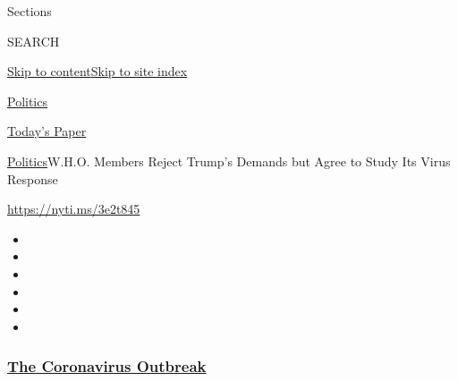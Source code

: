 Sections

SEARCH

\protect\hyperlink{site-content}{Skip to
content}\protect\hyperlink{site-index}{Skip to site index}

\href{https://www.nytimes3xbfgragh.onion/section/politics}{Politics}

\href{https://myaccount.nytimes3xbfgragh.onion/auth/login?response_type=cookie\&client_id=vi}{}

\href{https://www.nytimes3xbfgragh.onion/section/todayspaper}{Today's
Paper}

\href{/section/politics}{Politics}\textbar{}W.H.O. Members Reject
Trump's Demands but Agree to Study Its Virus Response

\url{https://nyti.ms/3e2t845}

\begin{itemize}
\item
\item
\item
\item
\item
\item
\end{itemize}

\hypertarget{the-coronavirus-outbreak}{%
\subsubsection{\texorpdfstring{\href{https://www.nytimes3xbfgragh.onion/news-event/coronavirus?name=styln-coronavirus-national\&region=TOP_BANNER\&variant=undefined\&block=storyline_menu_recirc\&action=click\&pgtype=Article\&impression_id=c82e3b80-e3aa-11ea-a48e-b9252519409f}{The
Coronavirus
Outbreak}}{The Coronavirus Outbreak}}\label{the-coronavirus-outbreak}}

